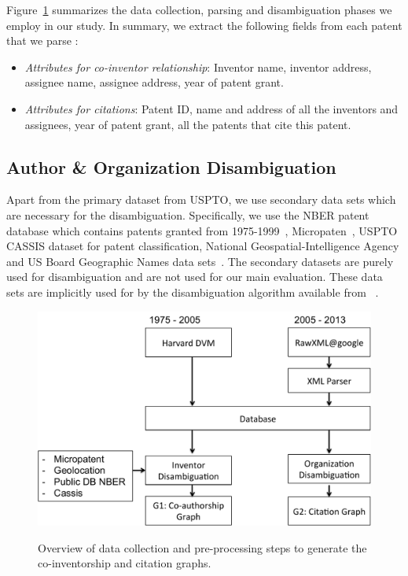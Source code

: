Figure~\ref{process} summarizes the data collection, parsing and disambiguation phases we employ in our study.
In summary, we extract the following fields from each patent that we parse :

\begin{itemize}
\squish
\item {\em Attributes for co-inventor relationship}:
Inventor name, inventor address, assignee name, assignee address, year of patent grant.

\item {\em Attributes for citations}:
Patent ID, name and address of all the inventors and assignees, year of patent grant, all the patents that cite this patent.
\end{itemize}


\subsection{Author \& Organization Disambiguation}

Apart from the primary dataset from USPTO, we use secondary data sets which are necessary for the disambiguation. Specifically, we use the NBER patent database which contains patents granted from 1975-1999~\cite{NBER}, Micropaten~\cite{micropatent}, USPTO CASSIS dataset for patent classification, National Geospatial-Intelligence Agency and US Board Geographic Names data sets~\cite{geocoding, geotable}. The secondary datasets are purely used for disambiguation and are not used for our main evaluation. These data sets are implicitly used for by the disambiguation algorithm available from ~\cite{disambiguation}.

\begin{figure}[H]
		  \centering	
          \includegraphics[scale=0.5]{../figures/process.pdf}
          \label{process}
          \caption{Overview of data collection and pre-processing steps to generate the co-inventorship and citation graphs.}
\end{figure}


